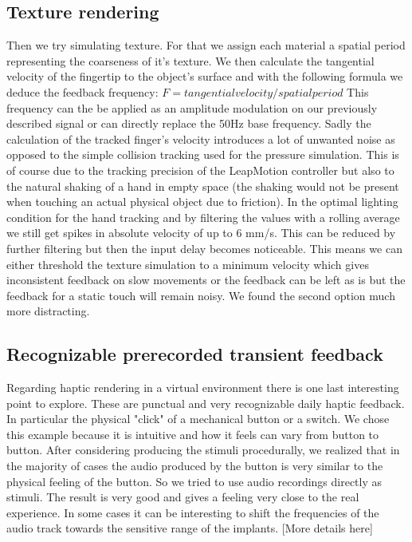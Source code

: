 \documentclass[10pt,journal,compsoc]{IEEEtran}
\begin{document}
\subsection{Texture rendering}
	Then we try simulating texture. For that we assign each material a spatial period representing the coarseness of it's texture. We then calculate the tangential velocity of the fingertip to the object's surface and with the following formula \cite{bensmaia2003smr} we deduce the feedback frequency:
	$F = tangential velocity / spatial period$
	This frequency can the be applied as an amplitude modulation on our previously described signal or can directly replace the 50Hz base frequency.
	Sadly the calculation of the tracked finger's velocity introduces a lot of unwanted noise as opposed to the simple collision tracking used for the pressure simulation. This is of course due to the tracking precision of the LeapMotion controller but also to the natural shaking of a hand in empty space (the shaking would not be present when touching an actual physical object due to friction). In the optimal lighting condition for the hand tracking and by filtering the values with a rolling average we still get spikes in absolute velocity of up to 6 mm/s. This can be reduced by further filtering but then the input delay becomes noticeable.
	This means we can either threshold the texture simulation to a minimum velocity which gives inconsistent feedback on slow movements or the feedback can be left as is but the feedback for a static touch will remain noisy. We found the second option much more distracting. 

\subsection{Recognizable prerecorded transient feedback}
Regarding haptic rendering in a virtual environment there is one last interesting point to explore. These are punctual and very recognizable daily haptic feedback. In particular the physical "click" of a mechanical button or a switch. We chose this example because it is intuitive and how it feels can vary from button to button.
After considering producing the stimuli procedurally, we realized that in the majority of cases the audio produced by the button is very similar to the physical feeling of the button. So we tried to use audio recordings directly as stimuli. The result is very good and gives a feeling very close to the real experience.
In some cases it can be interesting to shift the frequencies of the audio track towards the sensitive range of the implants.
[More details here]
	
\end{document}
